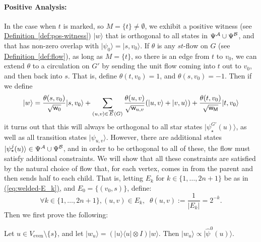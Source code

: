 \documentclass{theoretics}
\newcommand{\eq}[1]{\hyperref[eq:#1]{(\ref*{eq:#1})}}
\newcommand{\defin}[1]{\hyperref[def:#1]{Definition~\ref*{def:#1}}}
\def\ket#1{{\lvert}#1\rangle}
\def\bra#1{{\langle}#1\rvert}
\renewcommand{\>}{\rangle}
\newcommand{\<}{\langle}
\renewcommand{\(}{\left(}
\renewcommand{\)}{\right)}
\def\w{{\sf w}}
\begin{document}
\paragraph{Positive Analysis:} In the case when $t$ is marked, so $M=\{t\}\neq\emptyset$, we exhibit a positive witness (see \defin{pos-witness}) $\ket{w}$ that is orthogonal to all states in $\Psi^{\cal A}\cup \Psi^{\cal B}$, and that has non-zero overlap with $\ket{\psi_0}=\ket{s,v_0}$. If $\theta$ is any $st$-flow on $G$ (see \defin{flow}), as long as $M=\{t\}$, so there is an edge from $t$ to $v_0$, we can extend $\theta$ to a circulation on $G'$ by sending the unit flow coming into $t$ out to $v_0$, and then back into $s$. That is, define $\theta(t,v_0)=1$, and $\theta(s,v_0)=-1$. Then if we define 
\begin{equation}
\ket{w}=\frac{\theta(s,v_0)}{\sqrt{\w_0}}\ket{s,v_0}+\sum_{(u,v)\in\overrightarrow{E}(G)}\frac{\theta(u,v)}{\sqrt{\w_{u,v}}}(\ket{u,v}+\ket{v,u})+\frac{\theta(t,v_0)}{\sqrt{\w_{\sf M}}}\ket{t,v_0}
\label{eq:welded-pos-witness}
\end{equation}
it turns out that this will always be orthogonal to all star states $\ket{\psi_\star^{G'}(u)}$, as well as all transition states $\ket{\psi_{u,v}}$. However, there are additional states $\ket{\psi^j_\star(u)}\in\Psi^{\cal A}\cup \Psi^{\cal B}$, and in order to be orthogonal to all of these, the flow must satisfy additional constraints. We will show that all these constraints are satisfied by the natural choice of flow that, for each vertex, comes in from the parent and then sends half to each child. That is, letting $E_k$ for $k\in \{1,\dots,2n+1\}$ be as in \eq{welded-E_k}, and $E_0=\{(v_0,s)\}$, define:
\begin{equation}
\forall k\in \{1,\dots,2n+1\}, (u,v)\in E_k,\;\; \theta(u,v) := \frac{1}{|E_k|}=2^{-k}. \label{eq:welded-flow}
\end{equation}
Then we first prove the following:
\begin{claim}\label{clm:welded-pos}
Let $u\in V_{\mathrm{even}}\setminus\{s\}$, and let $\ket{w_u} = (\ket{u}\bra{u}\otimes I)\ket{w}.$
Then $\ket{w_u}\propto \ket{\widehat{\psi}^0(u)}$.
\end{claim}
\end{document}
